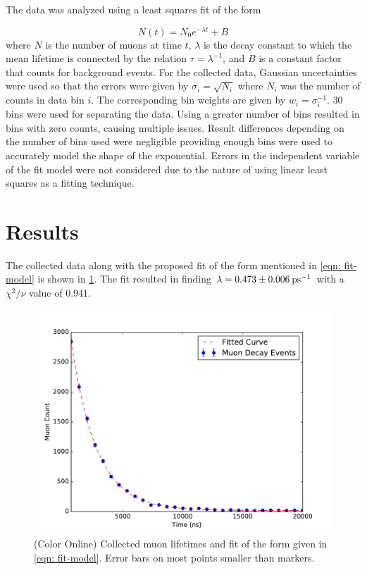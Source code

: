 \documentclass[reprint]{revtex4-1}
\begin{document}
The data was analyzed using a least squares fit of the form

\begin{equation}
N(t) = N_0 e^{- \lambda t } + B
\label{eqn: fit-model}
\end{equation}
where $N$ is the number of muons at time $t$, $\lambda$ is the decay constant to which the mean lifetime is connected by the relation $\tau = \lambda^{-1}$, and $B$ is a constant factor that counts for background events. For the collected data, Gaussian uncertainties were used so that the errors were given by $\sigma_i = \sqrt{N_i}$ where $N_i$ was the number of counts in data bin $i$. The corresponding bin weights are given by $w_i = \sigma_{i}^{-1}$. $30$ bins were used for separating the data. Using a greater number of bins resulted in bins with zero counts, causing multiple issues. Result differences depending on the number of bins used were negligible providing enough bins were used to accurately model the shape of the exponential. Errors in the independent variable of the fit model were not considered due to the nature of using linear least squares as a fitting technique.

\section{Results}

The collected data along with the proposed fit of the form mentioned in \cref{eqn: fit-model} is shown in \cref{fig: fitted-data}. The fit resulted in finding $\lambda = 0.473 \pm 0.006\:\rm{ps}^{-1}$ with a $\chi^2 / \nu$ value of $0.941$.

\begin{figure}
\includegraphics[width=\columnwidth]{../resources/muon-plot.pdf}
\caption{(Color Online) Collected muon lifetimes and fit of the form given in \cref{eqn: fit-model}. Error bars on most points smaller than markers.}
\label{fig: fitted-data}
\end{figure}
\end{document}
